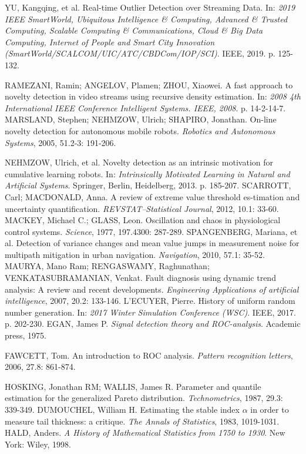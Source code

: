 \documentclass[11pt,twoside,openright]{report}
\begin{document}
\begin{thebibliography}{L}
YU, Kangqing, et al. Real-time Outlier Detection over Streaming Data. In: \textit{2019 IEEE SmartWorld, Ubiquitous Intelligence \& Computing, Advanced \& Trusted Computing, Scalable Computing \& Communications, Cloud \& Big Data Computing, Internet of People and Smart City Innovation (SmartWorld/SCALCOM/UIC/ATC/CBDCom/IOP/SCI)}. IEEE, 2019. p. 125-132.

RAMEZANI, Ramin; ANGELOV, Plamen; ZHOU, Xiaowei. A fast approach to novelty detection in video streams using recursive density estimation. In: \textit{2008 4th International IEEE Conference Intelligent Systems. IEEE, 2008}. p. 14-2-14-7.
MARSLAND, Stephen; NEHMZOW, Ulrich; SHAPIRO, Jonathan. On-line novelty detection for autonomous mobile robots. \textit{Robotics and Autonomous Systems}, 2005, 51.2-3: 191-206.

NEHMZOW, Ulrich, et al. Novelty detection as an intrinsic motivation for cumulative learning robots. In: \textit{Intrinsically Motivated Learning in Natural and Artificial Systems}. Springer, Berlin, Heidelberg, 2013. p. 185-207.
SCARROTT, Carl; MACDONALD, Anna. A review of extreme value threshold es-timation and uncertainty quantification. \textit{REVSTAT–Statistical Journal}, 2012, 10.1: 33-60.
MACKEY, Michael C.; GLASS, Leon. Oscillation and chaos in physiological control systems. \textit{Science}, 1977, 197.4300: 287-289.
SPANGENBERG, Mariana, et al. Detection of variance changes and mean value jumps in measurement noise for multipath mitigation in urban navigation. \textit{Navigation}, 2010, 57.1: 35-52.
MAURYA, Mano Ram; RENGASWAMY, Raghunathan; VENKATASUBRAMANIAN, Venkat. Fault diagnosis using dynamic trend analysis: A review and recent developments. \textit{Engineering Applications of artificial intelligence}, 2007, 20.2: 133-146.
L'ECUYER, Pierre. History of uniform random number generation. In: \textit{2017 Winter Simulation Conference (WSC)}. IEEE, 2017. p. 202-230.
EGAN, James P. \textit{Signal detection theory and ROC-analysis}. Academic press, 1975.

FAWCETT, Tom. An introduction to ROC analysis. \textit{Pattern recognition letters}, 2006, 27.8: 861-874.

HOSKING, Jonathan RM; WALLIS, James R. Parameter and quantile estimation for the generalized Pareto distribution. \textit{Technometrics}, 1987, 29.3: 339-349.
DUMOUCHEL, William H. Estimating the stable index $\alpha$ in order to measure tail thickness: a critique. \textit{The Annals of Statistics}, 1983, 1019-1031.
HALD, Anders. \textit{A History of Mathematical Statistics from 1750 to 1930}. New York: Wiley, 1998.


\end{thebibliography}
\end{document}
